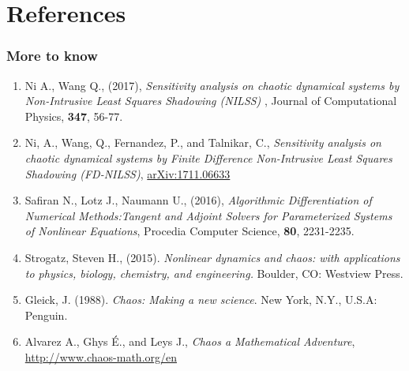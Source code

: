 \documentclass{beamer}
\begin{document}
\section{References}
\begin{frame}
  \frametitle{More to know}
  \begin{scriptsize}
  \begin{enumerate}
    \item Ni A., Wang Q., (2017), \textit{Sensitivity analysis on chaotic dynamical systems by Non-Intrusive Least Squares Shadowing (NILSS)} , Journal of Computational Physics, \textbf{347}, 56-77.
    \item {Ni}, A., {Wang}, Q., {Fernandez}, P., and {Talnikar}, C., \textit{Sensitivity analysis on chaotic dynamical systems by Finite Difference Non-Intrusive Least Squares Shadowing (FD-NILSS)}, \url{arXiv:1711.06633}
    \item Safiran N., Lotz J., Naumann U., (2016), \textit{Algorithmic Differentiation of Numerical Methods:Tangent and Adjoint Solvers for Parameterized Systems of Nonlinear Equations}, Procedia Computer Science, \textbf{80}, 2231-2235.
    \item Strogatz, Steven H., (2015). \textit{Nonlinear dynamics and chaos: with applications to physics, biology, chemistry, and engineering.} Boulder, CO: Westview Press.
    \item Gleick, J. (1988). \textit{Chaos: Making a new science}. New York, N.Y., U.S.A: Penguin.
    \item Alvarez A., Ghys É., and Leys J., \textit{Chaos a Mathematical Adventure}, \url{http://www.chaos-math.org/en}
  \end{enumerate}
\end{scriptsize}
\end{frame}
\end{document}

